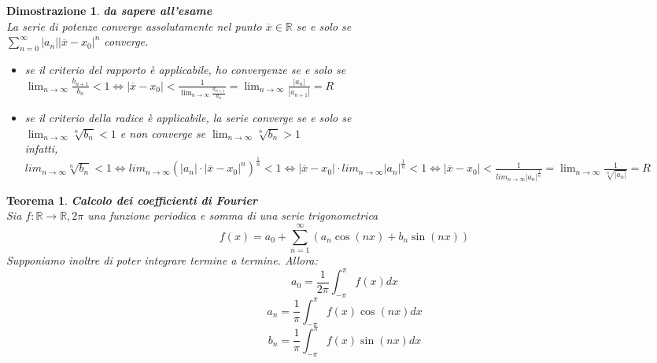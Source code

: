 \documentclass[10pt,landscape, a4paper]{article}
\newtheorem{teorema}{Teorema}
\newenvironment{thm}{\begin{mdframed}[backgroundcolor=white]\begin{teorema}}{\end{teorema}\end{mdframed}}
\newtheorem{demnstrn}{Dimostrazione}
\newenvironment{dimostrazione}{\begin{mdframed}[backgroundcolor=white]\begin{demnstrn}}{\end{demnstrn}\end{mdframed}}
\begin{document}
\begin{multicols}{3}
\begin{dimostrazione} 
	\emph{\textbf{da sapere all'esame}}\\
	La serie di potenze converge assolutamente nel punto $\overline{x} \in \mathbb{R}$ se e solo se\\
	$\sum_{n=0}^\infty \left\lvert a_n\right\rvert  \left\lvert \overline{x} -x_0\right\rvert ^n$ converge.\\
	\begin{itemize}
		\item se il criterio del rapporto è applicabile, ho convergenze se e solo se\\$\lim_{n\to\infty} \frac{b_{n+1}}{b_n} < 1\Leftrightarrow \left\lvert \overline{x} -x_0 \right\rvert < \frac{1}{\lim_{n\to\infty} \frac{a_{n+1}}{a_n}} = \lim_{n\to\infty} \frac{\left\lvert a_n\right\rvert }{\left\lvert a_{n+1}\right\rvert } = R$
		\item se il criterio della radice è applicabile, la serie converge se e solo se\\$\lim_{n\to\infty} \sqrt[n]{b_n}<1$ e non converge se $\lim_{n\to\infty} \sqrt[n]{b_n}>1$\\
		infatti, $lim_{n\to\infty} \sqrt[n]{b_n }<1  \Leftrightarrow lim_{n\to\infty} (|a_n|\cdot |\overline{x}-x_0|^n)^{\frac{1}{n}}<1 \Leftrightarrow |\overline{x}-x_0|\cdot lim_{n\to\infty} |a_n|^{\frac{1}{n}}<1 \Leftrightarrow |\overline{x}-x_0|<\frac{1}{lim_{n\to\infty} |a_n|^{\frac{1}{n}}} = \lim_{n\to\infty} \frac{1}{\sqrt[n]{|a_n|}} = R$
		
\end{itemize}
\end{dimostrazione}





\begin{thm}
\textbf{Calcolo dei coefficienti di Fourier}\\
	Sia $f:\mathbb{R}\to\mathbb{R}, 2\pi$ una funzione periodica e somma di una serie trigonometrica
	\begin{equation}
		f(x) = a_0 + \sum_{n=1}^\infty \left(a_n \cos(nx) + b_n \sin(nx)\right)
	\end{equation}
	Supponiamo inoltre di poter integrare termine a termine. Allora:
	\begin{equation}
		a_0 = \frac{1}{2\pi}\int_{-\pi}^\pi f(x)dx
	\end{equation}
	\begin{equation}
		a_n = \frac{1}{\pi}\int_{-\pi}^\pi f(x)\cos(nx)dx
	\end{equation}
	\begin{equation}
		b_n = \frac{1}{\pi}\int_{-\pi}^\pi f(x)\sin(nx)dx
	\end{equation}
\end{thm}



\end{multicols}
\end{document}
